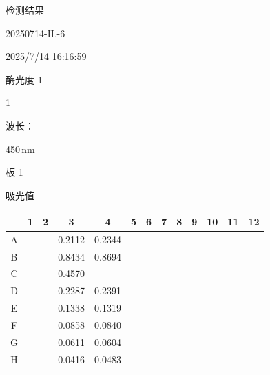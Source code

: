 \documentclass[UTF8,10pt,a4paper,fontset=fandol]{ctexart}
\newcommand{\fieldvalue}[1]{#1}
\begin{document}
\medskip
\noindent 检测结果

\fieldvalue{20250714-IL-6}

\fieldvalue{2025/7/14 16:16:59}

\noindent 酶光度 1

\fieldvalue{1}

\medskip
\noindent 波长：

\fieldvalue{450\,nm}

\noindent 板 1

\noindent 吸光值

\begin{center}
\scriptsize
\begin{tabular}{c|*{12}{c}}
 & 1 & 2 & 3 & 4 & 5 & 6 & 7 & 8 & 9 & 10 & 11 & 12\\ \hline
A & & & 0.2112 & 0.2344 & \text{---} & \text{---} & \text{---} & \text{---} & \text{---} & \text{---} & \text{---} & \\ \hline
B & & & 0.8434 & 0.8694 & \text{---} & \text{---} & \text{---} & \text{---} & \text{---} & \text{---} & \text{---} & \\ \hline
C & & & 0.4570 & \text{---} & \text{---} & \text{---} & \text{---} & \text{---} & \text{---} & \text{---} & \text{---} & \\ \hline
D & & & 0.2287 & 0.2391 & \text{---} & \text{---} & \text{---} & \text{---} & \text{---} & \text{---} & \text{---} & \\ \hline
E & & & 0.1338 & 0.1319 & \text{---} & \text{---} & \text{---} & \text{---} & \text{---} & \text{---} & \text{---} & \\ \hline
F & & & 0.0858 & 0.0840 & \text{---} & \text{---} & \text{---} & \text{---} & \text{---} & \text{---} & \text{---} & \\ \hline
G & & & 0.0611 & 0.0604 & \text{---} & \text{---} & \text{---} & \text{---} & \text{---} & \text{---} & \text{---} & \\ \hline
H & & & 0.0416 & 0.0483 & \text{---} & \text{---} & \text{---} & \text{---} & \text{---} & \text{---} & \text{---} &
\end{tabular}
\end{center}

\end{document}
